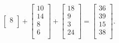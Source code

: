 \begin{eks}
\begin{center}
$$\begin{bmatrix}
8\\
\end{bmatrix}
+
\begin{bmatrix}
10\\
14\\
8\\
6\\
\end{bmatrix}
+
\begin{bmatrix}
18\\
9\\
3\\
24\\
\end{bmatrix}
=
\begin{bmatrix}
36\\
39\\
15\\
38\\
\end{bmatrix}.
$$
\end{center}
\end{eks}